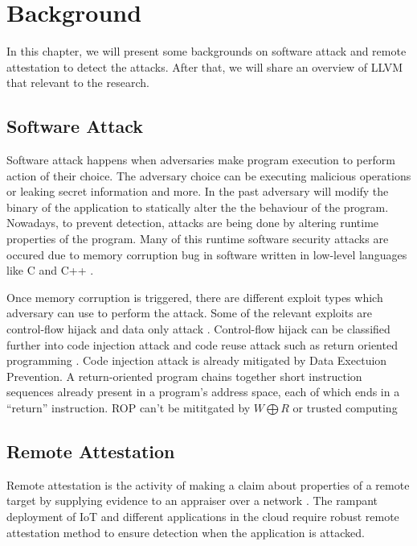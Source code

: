 
\chapter{Background} %

\label{Chapter2} %

In this chapter, we will present some backgrounds on software attack and remote attestation to detect the attacks. After that, we will share an overview of LLVM that relevant to the research. 

\section{Software Attack}

Software attack happens when adversaries make program execution to perform action of their choice. The adversary choice can be executing malicious operations or leaking secret information and more. In the past adversary will modify the binary of the application to statically alter the the behaviour of the program. Nowadays, to prevent detection, attacks are being done by altering runtime properties of the program. Many of this runtime software security attacks are occured due to memory corruption bug in software written in low-level languages like C and C++ \cite{szekeresSoKEternalWar2013}.

Once memory corruption is triggered, there are different exploit types which adversary can use to perform the attack. Some of the relevant exploits are control-flow hijack \cite{shachamGeometryInnocentFlesh2007, schusterCounterfeitObjectorientedProgramming2015}  and data only attack \cite{chenNonControlDataAttacksAre2005, carliniControlFlowBendingEffectiveness2015}. Control-flow hijack can be classified further into code injection attack and code reuse attack such as return oriented programming \cite{roemerReturnorientedProgrammingSystems2012}. Code injection attack is already mitigated by Data Exectuion Prevention. A return-oriented program chains together short instruction sequences already present in a program’s address space, each of which ends in a “return” instruction. ROP can't be mititgated by \( W \bigoplus R \) or trusted computing

\section{Remote Attestation}
Remote attestation is the activity of making a claim about properties of a remote target by supplying evidence to an appraiser over a network \cite{cokerPrinciplesRemoteAttestation2011a}. The rampant deployment of IoT and different applications in the cloud require robust remote attestation method to ensure detection when the application is attacked.

